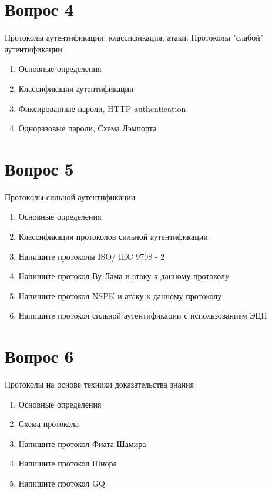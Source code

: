 \documentclass[a4paper,12pt]{article}
\begin{document}
	\section{Вопрос 4}
	Протоколы аутентификации: классификация, атаки. Протоколы "слабой" аутентификации
	\begin{enumerate}
		\item Основные определения
		\item Классификация аутентификации
		\item Фиксированные пароли, HTTP authentication
		\item Одноразовые пароли, Схема Лэмпорта
	\end{enumerate}
	\newpage
	
	
	\section{Вопрос 5}
	Протоколы сильной аутентификации
	\begin{enumerate}
		\item Основные определения
		\item Классификация протоколов сильной аутентификации
		\item Напишите протоколы ISO/ IEC 9798 - 2
		\item Напишите протокол Ву-Лама и атаку к данному протоколу
		\item Напишите протокол NSPK и атаку к данному протоколу
		\item Напишите протокол сильной аутентификации с использованием ЭЦП
	\end{enumerate}
	\newpage
	
	\section{Вопрос 6}
	Протоколы на основе техники доказательства знания
	\begin{enumerate}
		\item Основные определения
		\item Схема протокола
		\item Напишите протокол Фиата-Шамира
		\item Напишите протокол Шнора
		\item Напишите протокол GQ
	\end{enumerate}
	\newpage
	
\end{document}
